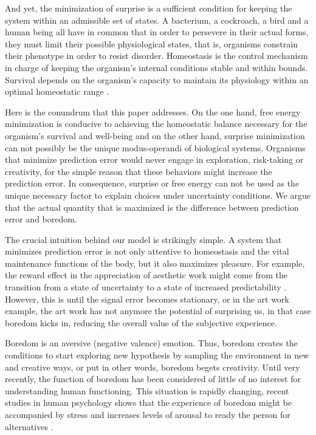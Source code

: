 \documentclass[11pt, onecolumn]{article}
\begin{document}
And yet, the minimization of surprise is a sufficient condition for keeping the system within an admissible set of states. 
A bacterium, a cockroach, a bird and a human being all have in common that in order to persevere in their actual forms, they must limit their possible physiological states, that is, organisms constrain their phenotype in order to resist disorder. 
Homeostasis is the control mechanism in charge of keeping the organism's internal conditions stable and within bounds. Survival depends on the organism's capacity to maintain its physiology within an optimal homeostatic range \citep{damasio_nature_2013}. 

Here is the conundrum that this paper addresses. On the one hand, free energy minimization is conducive to achieving the homeostatic balance necessary for the organism's survival and well-being and on the other hand, surprise minimization can not possibly be the unique modus-operandi of biological systems. Organisms that minimize prediction error would never engage in exploration, risk-taking or creativity, for the simple reason that these behaviors might increase the prediction error. 
In consequence, surprise or free energy can not be used as the unique necessary factor to explain choices under uncertainty conditions. We argue that the actual quantity that is maximized is the difference between prediction error and boredom. 

The crucial intuition behind our model is strikingly simple.
A system that minimizes prediction error is not only attentive to homeostasis and the vital maintenance functions of the body, but it also maximizes pleasure. For example, the reward effect in the appreciation of aesthetic work might come from the transition from a state of uncertainty to a state of increased predictability \citep{van_de_cruys_putting_2011}.
However, this is until the signal error becomes stationary, or in the art work example, the art work has not anymore the potential of surprising us, in that case boredom kicks in, reducing the overall value of the subjective experience.

Boredom is an aversive (negative valence) emotion. Thus, boredom creates the conditions to start exploring new hypothesis by sampling the environment in new and creative ways, or put in other words, boredom begets creativity. 
Until very recently, the function of boredom has been considered of little of no interest for understanding human functioning. This situation is rapidly changing, 
recent studies in human psychology shows that the experience of boredom might be accompanied by stress and increases levels of arousal to ready the person for alternatives \citep{posner_neurophysiological_2009} \citep{bench_function_2013}. 
\end{document}
